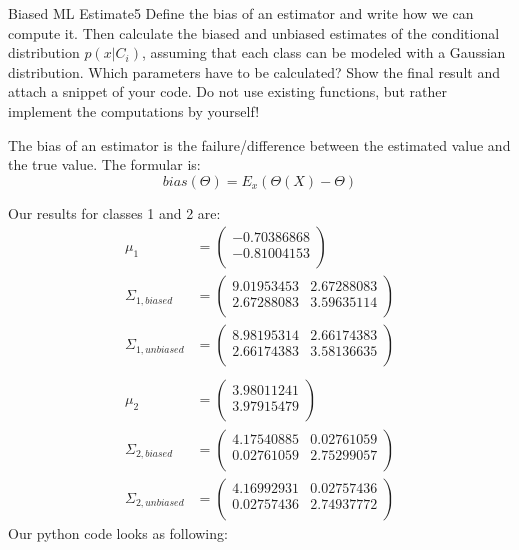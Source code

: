 \begin{questions}

\begin{question}{Biased ML Estimate}{5}
Define the bias of an estimator and write how we can compute it.
Then calculate the biased and unbiased estimates of the conditional distribution $p(x|C_i)$, assuming that each class can be modeled with a Gaussian distribution. Which parameters have to be calculated?
Show the final result and attach a snippet of your code.
Do not use existing functions, but rather implement the computations by yourself!

\begin{answer}
The bias of an estimator is the failure/difference between the estimated value and the true value. The formular is:
\[
	bias(\Theta )=E_x(\Theta (X)-\Theta )
\]

Our results for classes 1 and 2 are:
\begin{align*}
\mu_1 &= \begin{pmatrix} 
-0.70386868 \\
-0.81004153 \\
\end{pmatrix} \\
\Sigma_{1, biased} &= \begin{pmatrix}
9.01953453 & 2.67288083 \\
2.67288083& 3.59635114 \\
\end{pmatrix} \\
\Sigma_{1, unbiased} &= \begin{pmatrix}
8.98195314 & 2.66174383 \\
2.66174383 & 3.58136635 \\
\end{pmatrix} \\ \\
\mu_2 &= \begin{pmatrix} 
3.98011241 \\
3.97915479 \\
\end{pmatrix} \\
\Sigma_{2, biased} &= \begin{pmatrix}
4.17540885 & 0.02761059 \\
0.02761059 & 2.75299057 \\
\end{pmatrix} \\
\Sigma_{2, unbiased} &= \begin{pmatrix}
4.16992931 & 0.02757436 \\
0.02757436 & 2.74937772 \\
\end{pmatrix}
\end{align*}
Our python code looks as following:\\



\end{answer}
\end{question}
\end{questions}
